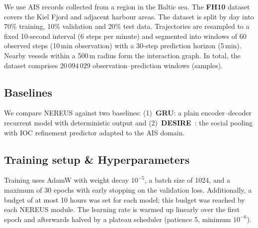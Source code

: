 \documentclass[runningheads]{preamp/llncs}
\begin{document}
We use \ac{AIS} records collected from a region in the Baltic sea.
The \textbf{FH10} dataset covers the Kiel Fjord and adjacent
harbour areas.
The dataset is split by day into 70\% training, 10\% validation and 20\% test data.
Trajectories are resampled to a fixed 10-second interval
(6 steps per minute) and segmented into windows of 60 observed steps
(10\,min observation) with a 30-step prediction horizon (5\,min).
Nearby vessels within a 500\,m radius form the interaction graph.
In total, the dataset comprises $20\,094\,029$ observation--prediction windows (samples).

\subsection{Baselines}

We compare \ac{NEREUS} against two baselines:
(1)~\textbf{GRU}: a plain encoder--decoder recurrent model with
deterministic output and
(2)~\textbf{DESIRE}~\cite{lee2017desire}: the social pooling with \ac{IOC} refinement predictor adapted to the \ac{AIS} domain.

\subsection{Training setup \& Hyperparameters}

Training uses AdamW with weight decay $10^{-5}$, a batch size of 1024, and a maximum of 30 epochs with early stopping on the validation loss.
Additionally, a budget of at most 10 hours was set for each model; this budget was reached by each NEREUS module. The learning rate is warmed up linearly over the first epoch and afterwards halved by a plateau scheduler (patience 5, minimum $10^{-6}$).
\end{document}
